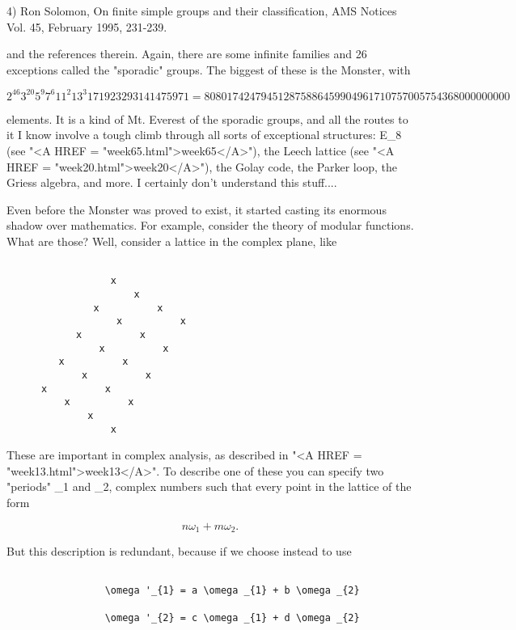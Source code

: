 4) Ron Solomon, On finite simple groups and their classification, AMS
Notices Vol. 45, February 1995, 231-239.

and the references therein.  Again, there are some infinite families and
26 exceptions called the "sporadic" groups.  The biggest of these
is the Monster, with 


$$

 2^{46} 3^{20} 5^{9} 7^{6} 11^{2} 13^{3} 17 19 23 29 31 41 47 59 71  = 
 808017424794512875886459904961710757005754368000000000
$$
    

elements.  It is a kind of Mt. Everest of the sporadic groups, and all
the routes to it I know involve a tough climb through all sorts of
exceptional structures: E_{8} (see "<A HREF =
"week65.html">week65</A>"), the Leech lattice (see "<A HREF =
"week20.html">week20</A>"), the Golay code, the Parker loop, the
Griess algebra, and more.  I certainly don't understand this stuff....

Even before the Monster was proved to exist, it started casting its
enormous shadow over mathematics.  For example, consider the theory
of modular functions.  What are those?  Well, consider a lattice in the
complex plane, like 



\begin{verbatim}

                  x
                      x
               x          x
                   x          x 
            x          x
                x          x
         x          x
             x          x
      x          x   
          x          x
              x 
                  x
\end{verbatim}
    

These are important in complex analysis, as described in "<A HREF =
"week13.html">week13</A>".  To describe one of these you can specify
two "periods" \omega _{1} and \omega _{2}, complex numbers
such that every point in the lattice of the form


$$

                   n \omega _{1} + m \omega _{2}.
$$
    

But this description is redundant, because if we choose instead to
use


\begin{verbatim}

                 \omega '_{1} = a \omega _{1} + b \omega _{2}

                 \omega '_{2} = c \omega _{1} + d \omega _{2}
\end{verbatim}
    
